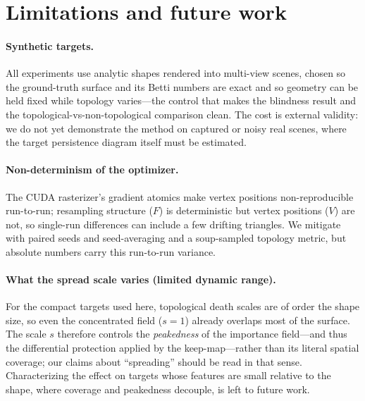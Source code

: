 \section{Limitations and future work}
\label{sec:limitations}

\paragraph{Synthetic targets.}
All experiments use analytic shapes rendered into multi-view scenes, chosen so
the ground-truth surface and its Betti numbers are exact and so geometry can be
held fixed while topology varies---the control that makes the blindness result
and the topological-vs-non-topological comparison clean. The cost is external
validity: we do not yet demonstrate the method on captured or noisy real scenes,
where the target persistence diagram itself must be estimated.

\paragraph{Non-determinism of the optimizer.}
The CUDA rasterizer's gradient atomics make vertex positions non-reproducible
run-to-run; resampling structure ($F$) is deterministic but vertex positions
($V$) are not, so single-run differences can include a few drifting triangles. We
mitigate with paired seeds and seed-averaging and a soup-sampled topology metric,
but absolute numbers carry this run-to-run variance.

\paragraph{What the spread scale varies (limited dynamic range).}
For the compact targets used here, topological death scales are of order the shape
size, so even the concentrated field ($s{=}1$) already overlaps most of the surface.
The scale $s$ therefore controls the \emph{peakedness} of the importance field---and
thus the differential protection applied by the keep-map---rather than its literal
spatial coverage; our claims about ``spreading'' should be read in that sense.
Characterizing the effect on targets whose features are small relative to the shape,
where coverage and peakedness decouple, is left to future work.

